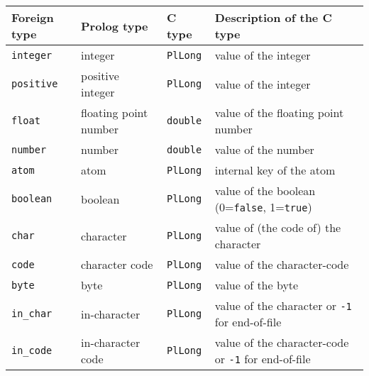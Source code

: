 \begin{tabular}{|l|l|l|l|}
\hline

Foreign type & Prolog type & C type & Description of the C type \\

\hline\hline

\texttt{integer} & integer & \texttt{PlLong} & value of the integer \\

\hline

\texttt{positive} & positive integer & \texttt{PlLong} & value of the integer
\\

\hline

\texttt{float} & floating point number & \texttt{double} & value of the
floating point number \\

\hline

\texttt{number} & number & \texttt{double} & value of the number \\

\hline

\texttt{atom} & atom & \texttt{PlLong} & internal key of the atom \\

\hline

\texttt{boolean} & boolean & \texttt{PlLong} & value of the boolean
(0=\texttt{false}, 1=\texttt{true}) \\

\hline

\texttt{char} & character & \texttt{PlLong} & value of (the code of) the
character \\

\hline

\texttt{code} & character code & \texttt{PlLong} & value of the character-code
\\

\hline

\texttt{byte} & byte & \texttt{PlLong} & value of the byte \\

\hline

\texttt{in\_char} & in-character & \texttt{PlLong} & value of the character or
\texttt{-1} for end-of-file \\

\hline

\texttt{in\_code} & in-character code & \texttt{PlLong} & value of the
character-code or \texttt{-1} for end-of-file \\


\end{tabular}
